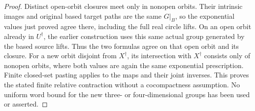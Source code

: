 \begin{proof}
Distinct open-orbit closures meet only
in nonopen orbits. Their intrinsic
images and original based target
paths are the same $G|_B$, so the
exponential values just proved agree
there, including the full real
circle lifts.
On an open orbit already in
$U^\dagger$, the earlier construction
uses this same actual group generated
by the based source lifts.
Thus the two formulas agree on that
open orbit and its closure. For a
new orbit disjoint from $X^\dagger$,
its intersection with $X^\dagger$
consists only of nonopen orbits,
where both values are again the
same exponential prescription.
Finite closed-set pasting applies
to the maps and their joint inverses.
This proves the stated finite relative
contraction without a cocompactness
assumption. No uniform word bound for
the new three- or four-dimensional
groups has been used or asserted.
\end{proof}
